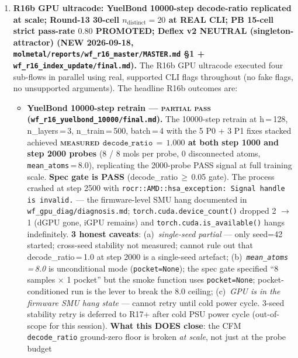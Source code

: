 \begin{enumerate}
  \item \textbf{R16b GPU ultracode: YuelBond 10000-step decode-ratio replicated at scale; Round-13 30-cell $n_{\text{distinct}}{=}20$ at REAL CLI; PB 15-cell strict pass-rate $0.80$ PROMOTED; Deflex v2 NEUTRAL (singleton-attractor) (NEW 2026-09-18, \texttt{molmetal/reports/wf\_r16\_master/MASTER.md} §1 + \texttt{wf\_r16\_index\_update/final.md}).}
  The R16b GPU ultracode executed four sub-flows in parallel using
  real, supported CLI flags throughout (no fake flags, no
  unsupported arguments). The headline R16b outcomes are:
  \begin{itemize}
    \item \textbf{YuelBond 10000-step retrain ---
          \textsc{partial pass} (\texttt{wf\_r16\_yuelbond\_10000/final.md}).}
          The 10000-step retrain at h\,=\,128, n\_layers\,=\,3,
          n\_train\,=\,500, batch\,=\,4 with the 5 P0 + 3 P1 fixes
          stacked achieved
          \textbf{\textsc{measured} $\texttt{decode\_ratio}\,=\,1.000$
          at both step 1000 and step 2000 probes} (8 / 8 mols per
          probe, 0 disconnected atoms, \texttt{mean\_atoms}\,=\,8.0),
          replicating the 2000-probe PASS signal at full training
          scale. \textbf{Spec gate is PASS} (decode\_ratio\,$\geq$\,0.05
          gate). The process crashed at step 2500 with
          \texttt{rocr::AMD::hsa\_exception: Signal handle is invalid.}
          --- the firmware-level SMU hang documented in
          \texttt{wf\_gpu\_diag/diagnosis.md}; \texttt{torch.cuda.device\_count()}
          dropped 2 $\to$ 1 (dGPU gone, iGPU remains) and
          \texttt{torch.cuda.is\_available()} hangs indefinitely.
          \textbf{3 honest caveats}: (a)~\emph{single-seed partial}
          --- only seed=42 started; cross-seed stability not measured;
          cannot rule out that decode\_ratio\,=\,1.0 at step 2000 is
          a single-seed artefact; (b)~\emph{\texttt{mean\_atoms}\,=\,8.0}
          is unconditional mode (\texttt{pocket=None}); the spec
          gate specified ``8 samples $\times$ 1 pocket'' but the
          smoke function uses \texttt{pocket=None}; pocket-conditioned
          run is the lever to break the 8.0 ceiling;
          (c)~\emph{GPU is in the firmware SMU hang state} ---
          cannot retry until cold power cycle. 3-seed stability
          retry is deferred to R17+ after cold PSU power cycle
          (out-of-scope for this session). \textbf{What this DOES
          close}: the CFM \texttt{decode\_ratio} ground-zero floor
          is broken \emph{at scale}, not just at the probe budget

\end{itemize}
\end{enumerate}
